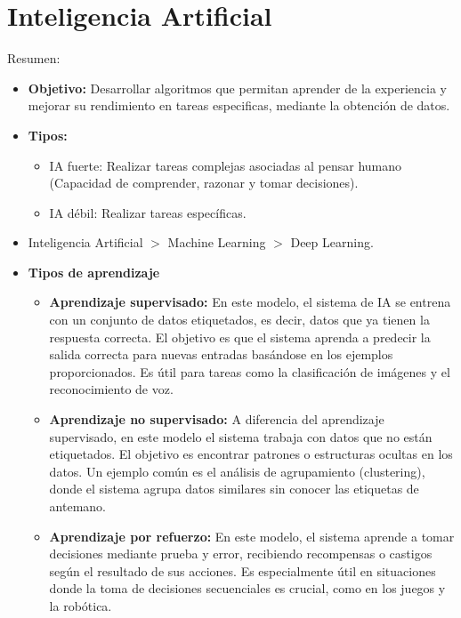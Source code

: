 \documentclass{templateApunte}
\begin{document}
\section{Inteligencia Artificial} \hypertarget{ppt}{}
Resumen:
\begin{itemize}
  \item \textbf{Objetivo:} Desarrollar algoritmos que permitan aprender de la experiencia y mejorar su rendimiento en tareas especificas, mediante la obtención de datos.
  \item \textbf{Tipos:}
  \begin{itemize}
    \item IA fuerte: Realizar tareas complejas asociadas al pensar humano (Capacidad de comprender, razonar y tomar decisiones).
    \item IA débil: Realizar tareas específicas.
  \end{itemize}
  \item Inteligencia Artificial $>$ Machine Learning $>$ Deep Learning.
  \item \textbf{Tipos de aprendizaje}
  \begin{itemize}
    \item \textbf{Aprendizaje supervisado:} En este modelo, el sistema de IA se entrena con un conjunto de datos etiquetados, es decir, datos que ya tienen la respuesta correcta. El objetivo es que el sistema aprenda a predecir la salida correcta para nuevas entradas basándose en los ejemplos proporcionados. Es útil para tareas como la clasificación de imágenes y el reconocimiento de voz.
    \item \textbf{Aprendizaje no supervisado:} A diferencia del aprendizaje supervisado, en este modelo el sistema trabaja con datos que no están etiquetados. El objetivo es encontrar patrones o estructuras ocultas en los datos. Un ejemplo común es el análisis de agrupamiento (clustering), donde el sistema agrupa datos similares sin conocer las etiquetas de antemano.
    \item \textbf{Aprendizaje por refuerzo:} En este modelo, el sistema aprende a tomar decisiones mediante prueba y error, recibiendo recompensas o castigos según el resultado de sus acciones. Es especialmente útil en situaciones donde la toma de decisiones secuenciales es crucial, como en los juegos y la robótica.
  \end{itemize}
\end{itemize}
\end{document}
